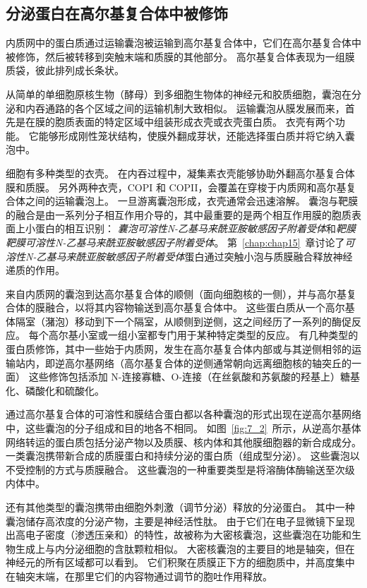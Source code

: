 \subsection{分泌蛋白在高尔基复合体中被修饰}

内质网中的蛋白质通过运输囊泡被运输到高尔基复合体中，它们在高尔基复合体中被修饰，然后被转移到突触末端和质膜的其他部分。
高尔基复合体表现为一组膜质袋，彼此排列成长条状。


从简单的单细胞原核生物（酵母）到多细胞生物体的神经元和胶质细胞，囊泡在分泌和内吞通路的各个区域之间的运输机制大致相似。
运输囊泡从膜发展而来，首先是在膜的胞质表面的特定区域中组装形成衣壳或衣壳蛋白质。
衣壳有两个功能。
它能够形成刚性笼状结构，使膜外翻成芽状，还能选择蛋白质并将它纳入囊泡中。


细胞有多种类型的衣壳。
在内吞过程中，凝集素衣壳能够协助外翻高尔基复合体膜和质膜。
另外两种衣壳，COPI 和 COPII，会覆盖在穿梭于内质网和高尔基复合体之间的运输囊泡上。
一旦游离囊泡形成，衣壳通常会迅速溶解。
囊泡与靶膜的融合是由一系列分子相互作用介导的，其中最重要的是两个相互作用膜的胞质表面上小蛋白的相互识别：
\textit{囊泡可溶性N-乙基马来酰亚胺敏感因子附着受体}和\textit{靶膜靶膜可溶性N-乙基马来酰亚胺敏感因子附着受体}。
第~\ref{chap:chap15}~章讨论了\textit{可溶性N-乙基马来酰亚胺敏感因子附着受体}蛋白通过突触小泡与质膜融合释放神经递质的作用。


来自内质网的囊泡到达高尔基复合体的顺侧（面向细胞核的一侧），并与高尔基复合体的膜融合，以将其内容物输送到高尔基复合体中。
这些蛋白质从一个高尔基体隔室（潴泡）移动到下一个隔室，从顺侧到逆侧，这之间经历了一系列的酶促反应。
每个高尔基小室或一组小室都专门用于某种特定类型的反应。
有几种类型的蛋白质修饰，其中一些始于内质网，发生在高尔基复合体内部或与其逆侧相邻的运输站内，即逆高尔基网络（高尔基复合体的逆侧通常朝向远离细胞核的轴突丘的一面）
这些修饰包括添加 N-连接寡糖、O-连接（在丝氨酸和苏氨酸的羟基上）糖基化、磷酸化和硫酸化。


通过高尔基复合体的可溶性和膜结合蛋白都以各种囊泡的形式出现在逆高尔基网络中，这些囊泡的分子组成和目的地各不相同。
如图~\ref{fig:7_2}~所示，从逆高尔基体网络转运的蛋白质包括分泌产物以及质膜、核内体和其他膜细胞器的新合成成分。
一类囊泡携带新合成的质膜蛋白和持续分泌的蛋白质（组成型分泌）。
这些囊泡以不受控制的方式与质膜融合。
这些囊泡的一种重要类型是将溶酶体酶输送至次级内体中。


还有其他类型的囊泡携带由细胞外刺激（调节分泌）释放的分泌蛋白。
其中一种囊泡储存高浓度的分泌产物，主要是神经活性肽。
由于它们在电子显微镜下呈现出高电子密度（渗透压亲和）的特性，故被称为大密核囊泡，这些囊泡在功能和生物生成上与内分泌细胞的含肽颗粒相似。
大密核囊泡的主要目的地是轴突，但在神经元的所有区域都可以看到。
它们积聚在质膜正下方的细胞质中，并高度集中在轴突末端，在那里它们的内容物通过调节的胞吐作用释放。


